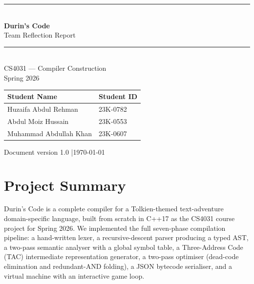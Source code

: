 \documentclass[12pt, a4paper]{article}
\begin{document}
\begin{titlepage}
  \centering
  \vspace*{2cm}
  {\color{durins-blue}\rule{\linewidth}{2pt}}\\[1em]
  {\Huge\bfseries\color{durins-blue} Durin's Code}\\[0.5em]
  {\LARGE\color{durins-gold} Team Reflection Report}\\[1em]
  {\color{durins-blue}\rule{\linewidth}{2pt}}\\[2em]

  {\large CS4031 --- Compiler Construction \\ Spring 2026}\\[3em]

  \begin{tabular}{ll}
    \toprule
    \textbf{Student Name} & \textbf{Student ID} \\
    \midrule
    Huzaifa Abdul Rehman   & 23K-0782 \\
    Abdul Moiz Hussain     & 23K-0553 \\
    Muhammad Abdullah Khan & 23K-0607 \\
    \bottomrule
  \end{tabular}

  \vfill
  {\small\color{durins-gray} Document version 1.0 \quad|\quad \today}
\end{titlepage}

\tableofcontents
\newpage

\section{Project Summary}

Durin's Code is a complete compiler for a Tolkien-themed text-adventure
domain-specific language, built from scratch in C++17 as the CS4031 course project
for Spring 2026.
We implemented the full seven-phase compilation pipeline:
a hand-written lexer, a recursive-descent parser producing a typed AST, a two-pass
semantic analyser with a global symbol table, a Three-Address Code (TAC) intermediate
representation generator, a two-pass optimiser (dead-code elimination and redundant-AND
folding), a JSON bytecode serialiser, and a virtual machine with an interactive game loop.
\end{document}
